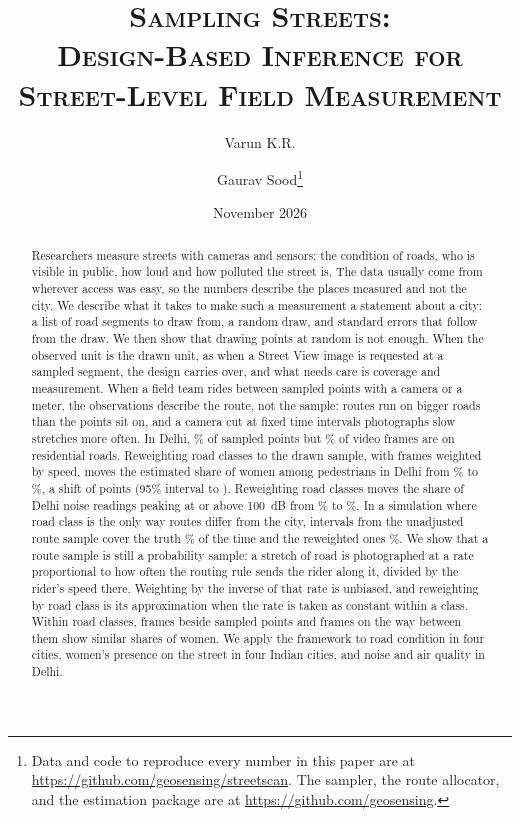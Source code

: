 \documentclass[11pt]{article}
\title{\scshape Sampling Streets:\\
Design-Based Inference for Street-Level Field Measurement}
\author{Varun K.R. \and Gaurav Sood\thanks{Data and code to reproduce every number in this paper are at \url{https://github.com/geosensing/streetscan}. The sampler, the route allocator, and the estimation package are at \url{https://github.com/geosensing}.}}
\date{November 2026}
\begin{document}
\maketitle

\begin{abstract}
Researchers measure streets with cameras and sensors: the condition of roads, who is visible in public, how loud and how polluted the street is. The data usually come from wherever access was easy, so the numbers describe the places measured and not the city. We describe what it takes to make such a measurement a statement about a city: a list of road segments to draw from, a random draw, and standard errors that follow from the draw. We then show that drawing points at random is not enough. When the observed unit is the drawn unit, as when a Street View image is requested at a sampled segment, the design carries over, and what needs care is coverage and measurement. When a field team rides between sampled points with a camera or a meter, the observations describe the route, not the sample: routes run on bigger roads than the points sit on, and a camera cut at fixed time intervals photographs slow stretches more often. In Delhi, \sampleresidentialDelhi\% of sampled points but \frameresidentialDelhi\% of video frames are on residential roads. Reweighting road classes to the drawn sample, with frames weighted by speed, moves the estimated share of women among pedestrians in Delhi from \videoDelhiperminuteofriding\% to \videoDelhiroadnetwork\%, a shift of \shiftDelhi{} points (95\% interval \shiftlowDelhi{} to \shifthighDelhi). Reweighting road classes moves the share of Delhi noise readings peaking at or above 100~dB from \noiseasreadmaxatleastOneZeroZero\% to \noiseroadnetworkmaxatleastOneZeroZero\%. In a simulation where road class is the only way routes differ from the city, intervals from the unadjusted route sample cover the truth \simcoveragerouteperminute\% of the time and the reweighted ones \simcoveragerouteroadnetwork\%. We show that a route sample is still a probability sample: a stretch of road is photographed at a rate proportional to how often the routing rule sends the rider along it, divided by the rider's speed there. Weighting by the inverse of that rate is unbiased, and reweighting by road class is its approximation when the rate is taken as constant within a class. Within road classes, frames beside sampled points and frames on the way between them show similar shares of women. We apply the framework to road condition in four cities, women's presence on the street in four Indian cities, and noise and air quality in Delhi.
\end{abstract}
\end{document}
